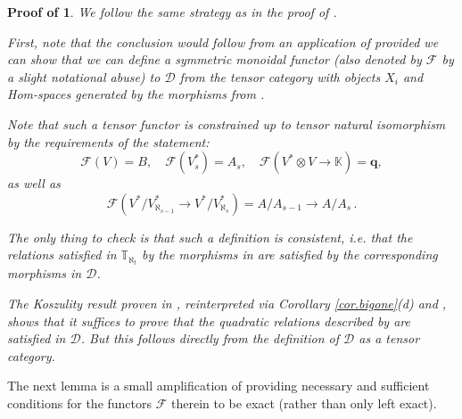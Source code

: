 \documentclass[11pt]{article}
\theoremstyle{plain}
\theoremstyle{nonumberplain}
\theoremstyle{plain}
\theoremstyle{nonumberplain}
\newtheorem{proof-of-univ}{Proof of \Cref{th.univ}}
\newcommand\bK{\mathbb K}
\newcommand\bT{\mathbb T}
\newcommand\cD{\mathcal D}
\begin{document}
\begin{proof-of-univ}
  We follow the same strategy as in the proof of \cite[Theorem
  3.22]{us}.

  First, note that the conclusion would follow from an application of
  \cite[Theorem 2.22]{us} provided we can show that we can define a
  symmetric monoidal functor (also denoted by $\mathcal{F}$ by a slight
  notational abuse) to $\cD$ from the tensor category with objects
  $X_i$ and Hom-spaces generated by the morphisms from .

  Note that such a tensor functor is constrained up to tensor natural
  isomorphism by the requirements of the statement:
  \begin{equation*}
    \mathcal{F}(V)=B,\quad \mathcal{F}\left(V^*_s\right) = A_s,\quad \mathcal{F}(V^*\otimes V\to \bK) = \mathbf{q}, 
  \end{equation*}
  as well as
  \begin{equation*}
    \mathcal{F}(V^*/V^*_{\aleph_{s-1}}\to V^*/V^*_{\aleph_{s}}) = A/A_{s-1}\to A/A_{s}\,.
  \end{equation*}

  The only thing to check is that such a definition is consistent,
  i.e. that the relations satisfied in $\bT_{\aleph_t}$ by the
  morphisms in  are satisfied by the corresponding
  morphisms in $\cD$.

  The Koszulity result proven in , reinterpreted via
  Corollary \ref{cor.bigone}(d) and , shows that it suffices to prove
  that the quadratic relations described by  are
  satisfied in $\mathcal{D}$.  But this follows directly from the definition of $\mathcal{D}$ as a tensor category.
\end{proof-of-univ}


The next lemma is a small amplification of 
providing necessary and sufficient conditions for the functors $\mathcal{F}$
therein to be exact (rather than only left exact).
\end{document}
